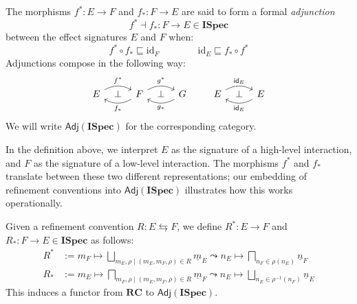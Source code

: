 \documentclass[sigplan,10pt,review,anonymous]{acmart}
\newcommand{\kw}[1]{\ensuremath{ \mathsf{#1} }}
\newcommand{\refby}{\sqsubseteq}
\newcommand{\ISpec}{\mathbf{ISpec}}
\begin{document}
\begin{definition}[Adjunction]
The morphisms
$f^* : E \rightarrow F$ and $f_* : F \rightarrow E$
are said to form a formal \emph{adjunction}
\[ f^* \dashv f_* : F \rightarrow E \in \ISpec \]
between the effect signatures $E$ and $F$
when:
\[
  f^* \circ f_* \refby \mathrm{id}_F
  \qquad \qquad
  \mathrm{id}_E \refby f_* \circ f^*
\]
Adjunctions compose in the following way:
\[
  \begin{tikzcd}[sep=tiny]
    E \ar[rr, "f^*", bend left] & \bot &
    F \ar[ll, "f_*", bend left]
      \ar[rr, "g^*", bend left] & \bot &
    G \ar[ll, "g_*", bend left]
  \end{tikzcd}
  \qquad
  \begin{tikzcd}[sep=tiny]
    E \ar[rr, "\kw{id}_E", bend left] & \bot &
    E \ar[ll, "\kw{id}_E", bend left]
  \end{tikzcd}
\]
We will write $\kw{Adj}(\ISpec)$ for the corresponding category.
\end{definition}

In the definition above,
we interpret
$E$ as the signature of a high-level interaction, and
$F$ as the signature of a low-level interaction.
The morphisms $f^*$ and $f_*$ translate between
these two different representations;
our embedding of refinement conventions into $\kw{Adj}(\ISpec)$
illustrates how this works operationally.

\begin{definition}
Given a refinement convention $R : E \leftrightarrows F$,
we define
$R^* : E \rightarrow F$ and
$R_* : F \rightarrow E \in \ISpec$ as follows:
\begin{align*}
  R^* &:= m_F \mapsto
    \bigsqcup_{m_E, \rho \mid (m_E, m_F, \rho) \in R}
    \underline{m}_E \leadsto n_E \mapsto
    \bigsqcap_{n_F \in \rho(n_E)}
    \underline{n}_F
  \\
  R_* &:= m_E \mapsto
    \bigsqcap_{m_F, \rho \mid (m_E, m_F, \rho) \in R}
    \underline{m}_F \leadsto n_E \mapsto
    \bigsqcup_{n_E \in \rho^{-1}(n_F)}
    \underline{n}_E
\end{align*}
This induces a functor from $\mathbf{RC}$ to $\kw{Adj}(\ISpec)$.
\end{definition}
\end{document}
